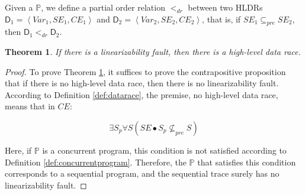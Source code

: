 \documentclass[runningheads]{llncs}
\newtheorem{myTheo}{Theorem}
\begin{document}
 Given a $\mathbb{P}$, we define a partial order relation $<_{dr}$ between two HLDRs $\mathsf{D}_1=\left\langle \mathit{Var}_1, \mathit{SE}_1, \mathit{CE}_1\right\rangle$ and $\mathsf{D}_2 = \left\langle \mathit{Var}_2, \mathit{SE}_2, \mathit{CE}_2\right\rangle$, that is, if $\mathit{SE}_1\subseteq_{pre}\mathit{SE}_2$, then $\mathsf{D}_1<_{dr}\mathsf{D}_2$. 




\begin{myTheo}\label{theo:datarace}
   If there is a linearizability fault, then there is a high-level data race.
\end{myTheo}

\begin{proof}
To prove Theorem \ref{theo:datarace}, it suffices to prove the contrapositive proposition that if there is no high-level data race, 
then there is no linearizability fault. According to Definition \ref{def:datarace}, the premise, no high-level data race, means that in $\mathit{CE}$:

$$\exists S_p \forall S ( \mathit{SE}\bullet S_p \nsubseteq_{pre} S)$$

Here, if $\mathbb{P}$ is a concurrent program, this condition is not satisfied according to Definition \ref{def:concurrentprogram}. 
Therefore, the $\mathbb{P}$ that satisfies this condition corresponds to a sequential program, and the sequential trace surely has no linearizability fault.
\end{proof}
\end{document}

